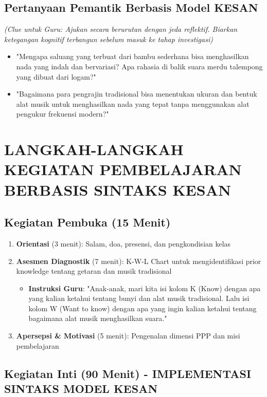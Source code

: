 \documentclass[12pt,a4paper]{article}
\begin{document}
\subsection{Pertanyaan Pemantik Berbasis Model KESAN}
\textit{(Clue untuk Guru: Ajukan secara berurutan dengan jeda reflektif. Biarkan ketegangan kognitif terbangun sebelum masuk ke tahap investigasi)}

\begin{itemize}
\item "Mengapa saluang yang terbuat dari bambu sederhana bisa menghasilkan nada yang indah dan bervariasi? Apa rahasia di balik suara merdu talempong yang dibuat dari logam?"
\item "Bagaimana para pengrajin tradisional bisa menentukan ukuran dan bentuk alat musik untuk menghasilkan nada yang tepat tanpa menggunakan alat pengukur frekuensi modern?"
\end{itemize}

\section{LANGKAH-LANGKAH KEGIATAN PEMBELAJARAN BERBASIS SINTAKS KESAN}

\subsection{Kegiatan Pembuka (15 Menit)}

\begin{enumerate}
\item \textbf{Orientasi} (3 menit): Salam, doa, presensi, dan pengkondisian kelas
\item \textbf{Asesmen Diagnostik} (7 menit): K-W-L Chart untuk mengidentifikasi prior knowledge tentang getaran dan musik tradisional
   \begin{itemize}
   \item \textbf{Instruksi Guru}: "Anak-anak, mari kita isi kolom K (Know) dengan apa yang kalian ketahui tentang bunyi dan alat musik tradisional. Lalu isi kolom W (Want to know) dengan apa yang ingin kalian ketahui tentang bagaimana alat musik menghasilkan suara."
   \end{itemize}
\item \textbf{Apersepsi \& Motivasi} (5 menit): Pengenalan dimensi PPP dan misi pembelajaran
\end{enumerate}

\subsection{Kegiatan Inti (90 Menit) - IMPLEMENTASI SINTAKS MODEL KESAN}
\end{document}
